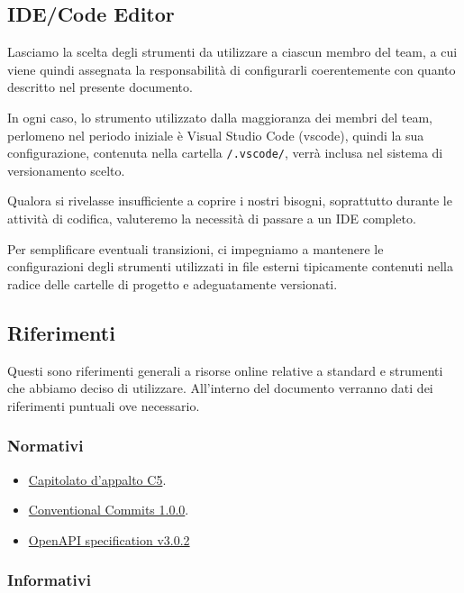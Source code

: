 \documentclass[../norme-di-progetto.tex]{subfiles}
\begin{document}
\subsection{IDE/Code Editor}%
\label{sub:ide_code_editor}

Lasciamo la scelta degli strumenti da utilizzare a ciascun membro del team, a cui viene quindi assegnata la responsabilità di configurarli coerentemente con quanto descritto nel presente documento.

In ogni caso, lo strumento utilizzato dalla maggioranza dei membri del team, perlomeno nel periodo iniziale è Visual Studio Code (vscode), quindi la sua configurazione, contenuta nella cartella \verb|/.vscode/|, verrà inclusa nel sistema di versionamento scelto.

Qualora si rivelasse insufficiente a coprire i nostri bisogni, soprattutto durante le attività di codifica, valuteremo la necessità di passare a un IDE completo.

Per semplificare eventuali transizioni, ci impegniamo a mantenere le configurazioni degli strumenti utilizzati in file esterni tipicamente contenuti nella radice delle cartelle di progetto e adeguatamente versionati.

\subsection{Riferimenti}%
\label{sub:riferimenti}

Questi sono riferimenti generali a risorse online relative a standard e strumenti che abbiamo deciso di utilizzare.
All'interno del documento verranno dati dei riferimenti puntuali ove necessario.

\subsubsection{Normativi}%
\label{subs:riferimenti/normativi}

\begin{itemize}
  \item \href{https://www.math.unipd.it/~tullio/IS-1/2019/Progetto/C5.pdf}{Capitolato d'appalto C5}.
  \item \href{https://www.conventionalcommits.org/en/v1.0.0/}{Conventional Commits 1.0.0}.
  \item \href{https://spec.openapis.org/oas/v3.0.2}{OpenAPI specification v3.0.2}
\end{itemize}

\subsubsection{Informativi}%
\label{subs:riferimenti/informativi}
\end{document}
